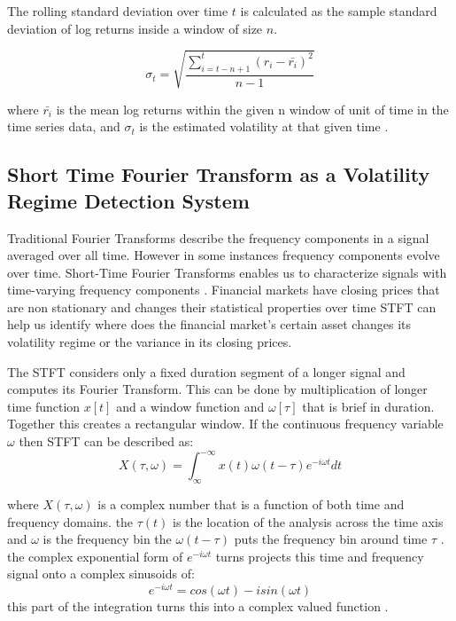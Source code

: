 \documentclass[12pt,letterpaper]{article}
\begin{document}
			The rolling standard deviation over time $t$ is calculated as the sample standard deviation of log returns inside a window of size $n$.
			
			\begin{equation}
				\sigma_t = \sqrt{\frac{\sum_{i=t-n+1}^{t} {(r_i-\bar{r_i})^2}}{n-1}}
			\end{equation}
			
			where $\bar{r_i}$ is the mean log returns within the given n window of unit of time in the time series data, and $\sigma_t$ is the estimated volatility at that given time \parencite{vipond_standard_deviation}.
		
		\subsection{Short Time Fourier Transform as a Volatility Regime Detection System}
			Traditional Fourier Transforms describe the frequency components in a signal averaged over all time. However in some instances frequency components evolve over time. Short-Time Fourier Transforms enables us to characterize signals with time-varying frequency components \parencite{stern_stft_notes}. Financial markets have closing prices that are non stationary and changes their statistical properties over time STFT can help us identify where does the financial market's certain asset changes its volatility regime or the variance in its closing prices.
			
			The STFT considers only a fixed duration segment of a longer signal and computes its Fourier Transform. This can be done by multiplication of longer time function $x[t]$ and a window function and $\omega[\tau]$ that is brief in duration. Together this creates a rectangular window. If the continuous frequency variable $\omega$ then STFT can be described as:
			\begin{equation}
				X(\tau,\omega) = \int_{\infty}^{-\infty} x(t) \omega(t - \tau) e^{-i \omega t}  dt
			\end{equation}
			
			where $X(\tau, \omega)$ is a complex number that is a function of both time and frequency domains. the $\tau(t)$ is the location of the analysis across the time axis and $\omega$ is the frequency bin the $\omega(t - \tau)$ puts the frequency bin around time $\tau$ \parencite{stern_stft_notes}. the complex exponential form of $	e^{-i \omega t}$ turns projects this time and frequency signal onto a complex sinusoids of:
			\begin{equation}
				e^{-i \omega t} = cos(\omega t) - i sin(\omega t)
			\end{equation}
			this part of the integration turns this into a complex valued function \parencite{Smith1997}.
			
\end{document}
